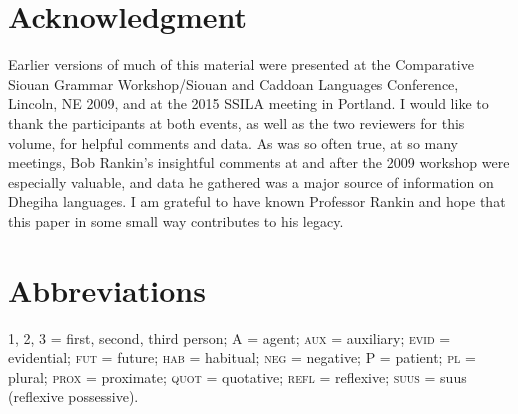 \documentclass[output=paper]{LSP/langsci}
\begin{document}
\section*{Acknowledgment}

Earlier versions of much of this material were presented at the Comparative Siouan Grammar Workshop/Siouan and Caddoan Languages Conference, Lincoln, NE 2009, and at the 2015 SSILA meeting in Portland. I would like to thank the participants at both events, as well as the two reviewers for this volume, for helpful comments and data. As was so often true, at so many meetings, Bob Rankin's insightful comments at and after the 2009 workshop were especially valuable, and data he gathered was a major source of information on Dhegiha languages. I am grateful to have known Professor Rankin and hope that this paper in some small way contributes to his legacy.

\section*{Abbreviations}

1, 2, 3 = first, second, third person; A = agent; \textsc{aux} = auxiliary; \textsc{evid} = evidential; \textsc{fut} = future; \textsc{hab} = habitual; \textsc{neg} = negative; P = patient; \textsc{pl} = plural; \textsc{prox} = proximate; \textsc{quot} = quotative; \textsc{refl} = reflexive; \textsc{suus} = suus (reflexive possessive). 


\printbibliography[heading=subbibliography,notkeyword=this]

\begin{reflist}
   
\end{reflist}
\end{document}
